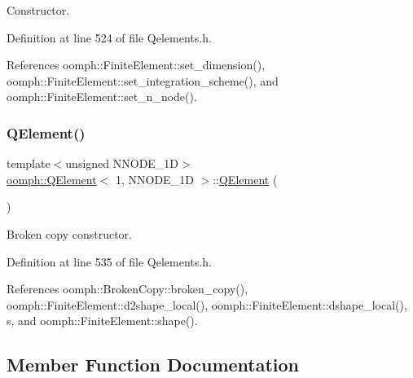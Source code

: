 Constructor. 



Definition at line 524 of file Qelements.\+h.



References oomph\+::\+Finite\+Element\+::set\+\_\+dimension(), oomph\+::\+Finite\+Element\+::set\+\_\+integration\+\_\+scheme(), and oomph\+::\+Finite\+Element\+::set\+\_\+n\+\_\+node().

\mbox{\label{classoomph_1_1QElement_3_011_00_01NNODE__1D_01_4_ac48f890bbb273d38ad7436db6b0e8693}} 
\subsubsection{\texorpdfstring{Q\+Element()}{QElement()}\hspace{0.1cm}{\footnotesize\ttfamily [2/2]}}
{\footnotesize\ttfamily template$<$unsigned N\+N\+O\+D\+E\+\_\+1D$>$ \\
\hyperlink{classoomph_1_1QElement}{oomph\+::\+Q\+Element}$<$ 1, N\+N\+O\+D\+E\+\_\+1D $>$\+::\hyperlink{classoomph_1_1QElement}{Q\+Element} (\begin{DoxyParamCaption}\item[{const \hyperlink{classoomph_1_1QElement}{Q\+Element}$<$ 1, N\+N\+O\+D\+E\+\_\+1D $>$ \&}]{ }\end{DoxyParamCaption})\hspace{0.3cm}{\ttfamily [inline]}}



Broken copy constructor. 



Definition at line 535 of file Qelements.\+h.



References oomph\+::\+Broken\+Copy\+::broken\+\_\+copy(), oomph\+::\+Finite\+Element\+::d2shape\+\_\+local(), oomph\+::\+Finite\+Element\+::dshape\+\_\+local(), s, and oomph\+::\+Finite\+Element\+::shape().



\subsection{Member Function Documentation}
\mbox{\label{classoomph_1_1QElement_3_011_00_01NNODE__1D_01_4_a2802d39509c1638f639fa825f8b0996e}} 

